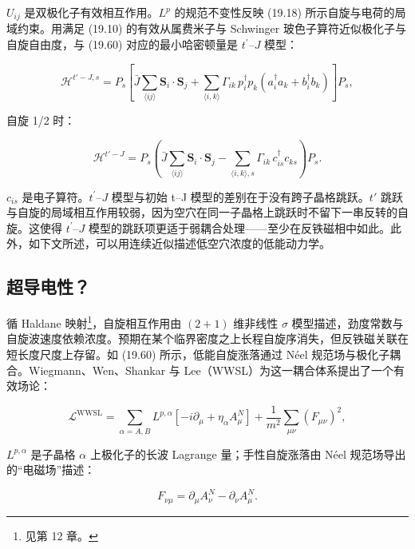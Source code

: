 $U_{ij}$ 是双极化子有效相互作用。$L^{p}$ 的规范不变性反映 (19.18) 所示自旋与电荷的局域约束。用满足 (19.10) 的有效从属费米子与 Schwinger 玻色子算符近似极化子与自旋自由度，与 (19.60) 对应的最小哈密顿量是 $t^{\prime}$--$J$ 模型：

\begin{equation*}
\mathcal {H} ^ {t ' - J, s} = P _ {s} \left[ \bar {J} \sum_{\langle ij \rangle} \mathbf {S} _ {i} \cdot \mathbf {S} _ {j} + \sum_{\langle i, k \rangle} \Gamma_{ik} \, p_{i} ^ {\dagger} p_{k} \left( a_{i} ^ {\dagger} a_{k} + b_{i} ^ {\dagger} b_{k} \right) \right] P _ {s} ,
\tag{19.61}
\end{equation*}

自旋 1/2 时：

\begin{equation*}
\mathcal {H} ^ {t ' - J} = P _ {s} \left( \bar {J} \sum_{\langle ij \rangle} \mathbf {S} _ {i} \cdot \mathbf {S} _ {j} - \sum_{\langle i, k \rangle, s} \Gamma_{ik} \, c _ {is} ^ {\dagger} c _ {ks} \right) P _ {s}.
\tag{19.62}
\end{equation*}

$c_{is}$ 是电子算符。$t^{\prime}$--$J$ 模型与初始 t--J 模型的差别在于没有跨子晶格跳跃。$t'$ 跳跃与自旋的局域相互作用较弱，因为空穴在同一子晶格上跳跃时不留下一串反转的自旋。这使得 $t^{\prime}$--$J$ 模型的跳跃项更适于弱耦合处理——至少在反铁磁相中如此。此外，如下文所述，可以用连续近似描述低空穴浓度的低能动力学。

\subsection{超导电性？}

循 Haldane 映射\footnote{见第 12 章。}，自旋相互作用由 $(2+1)$ 维非线性 {$\sigma$} 模型描述，劲度常数与自旋波速度依赖浓度。预期在某个临界密度之上长程自旋序消失，但反铁磁关联在短长度尺度上存留。如 (19.60) 所示，低能自旋涨落通过 Néel 规范场与极化子耦合。Wiegmann、Wen、Shankar 与 Lee（WWSL）为这一耦合体系提出了一个有效场论：

\begin{equation*}
\mathcal {L}^{\mathrm{WWSL}} = \sum_{\alpha = A, B} L^{p, \alpha} [ - i \partial_{\mu} + \eta_{\alpha} A_{\mu}^{N} ] + \frac {1}{m^ {2}} \sum_{\mu \nu} \left( F_{\mu \nu} \right) ^ {2} ,
\tag{19.63}
\end{equation*}

$L^{p,\alpha}$ 是子晶格 $\alpha$ 上极化子的长波 Lagrange 量；手性自旋涨落由 Néel 规范场导出的“电磁场”描述：

\begin{equation*}
F _ {\nu \mu} = \partial_ {\mu} A _ {\nu} ^ {N} - \partial_ {\nu} A _ {\mu} ^ {N}.
\tag{19.64}
\end{equation*}

